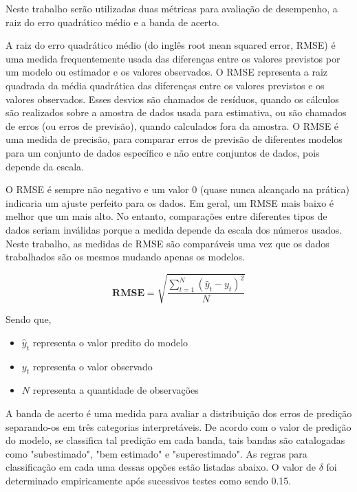 Neste trabalho serão utilizadas duas métricas para avaliação de desempenho, a raiz do erro quadrático médio e a banda de acerto.

A raiz do erro quadrático médio (do inglês root mean squared error, RMSE) é uma medida frequentemente usada das diferenças entre os valores previstos por um modelo ou estimador e os valores observados. O RMSE representa a raiz quadrada da média quadrática das diferenças entre os valores previstos e os valores observados. Esses desvios são chamados de resíduos, quando os cálculos são realizados sobre a amostra de dados usada para estimativa, ou são chamados de erros (ou erros de previsão), quando calculados fora da amostra. O RMSE é uma medida de precisão, para comparar erros de previsão de diferentes modelos para um conjunto de dados específico e não entre conjuntos de dados, pois depende da escala.

O RMSE é sempre não negativo e um valor 0 (quase nunca alcançado na prática) indicaria um ajuste perfeito para os dados. Em geral, um RMSE mais baixo é melhor que um mais alto. No entanto, comparações entre diferentes tipos de dados seriam inválidas porque a medida depende da escala dos números usados. Neste trabalho, as medidas de RMSE são comparáveis uma vez que os dados trabalhados são os mesmos mudando apenas os modelos.

\begin{equation}
\mathbf {RMSE} ={\sqrt {\frac {\sum _{t=1}^{N}({\hat {y}}_{t}-y_{t})^{2}}{N}}}
\end{equation}

Sendo que,

\begin{itemize}
    \item $ \hat y_t $ representa o valor predito do modelo
    \item $ y_t $ representa o valor observado
    \item $ N $ representa a quantidade de observações
\end{itemize}

A banda de acerto é uma medida para avaliar a distribuição dos erros de predição separando-os em três categorias interpretáveis. De acordo com o valor de predição do modelo, se classifica tal predição em cada banda, tais bandas são catalogadas como "subestimado", "bem estimado" e "superestimado". As regras para classificação em cada uma dessas opções estão listadas abaixo. O valor de $ \delta $ foi determinado empiricamente após sucessivos testes como sendo 0.15.

